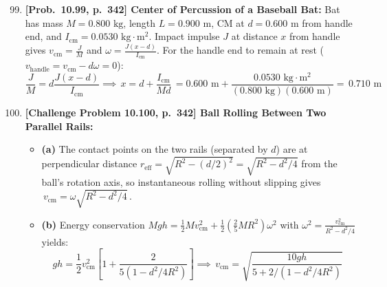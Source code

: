\documentclass[11pt,a4paper,openany,oneside]{book}
\newcommand{\eqbox}[1]{\boxed{\,#1\,}}
\numberwithin{equation}{chapter}
\begin{document}
\begin{enumerate}[label=\textbf{Prob.\ 10.\arabic*},leftmargin=4.5em]
  \setcounter{enumi}{98}
  \item \textbf{[Prob.\ 10.99, p.\ 342] Center of Percussion of a Baseball Bat:}
  Bat has mass $M = 0.800\text{ kg}$, length $L = 0.900\text{ m}$, CM at $d = 0.600\text{ m}$ from handle end, and $I_{\text{cm}} = 0.0530\text{ kg}\cdot\text{m}^2$. Impact impulse $J$ at distance $x$ from handle gives $v_{\text{cm}} = \frac{J}{M}$ and $\omega = \frac{J(x - d)}{I_{\text{cm}}}$. For the handle end to remain at rest ($v_{\text{handle}} = v_{\text{cm}} - d\omega = 0$):
  \begin{equation*}
    \frac{J}{M} = d\frac{J(x - d)}{I_{\text{cm}}} \implies \eqbox{x = d + \frac{I_{\text{cm}}}{Md}} = 0.600\text{ m} + \frac{0.0530\text{ kg}\cdot\text{m}^2}{(0.800\text{ kg})(0.600\text{ m})} = \eqbox{0.710\text{ m}}
  \end{equation*}

  \item \textbf{[Challenge Problem 10.100, p.\ 342] Ball Rolling Between Two Parallel Rails:}
  \begin{itemize}
    \item \textbf{(a)} The contact points on the two rails (separated by $d$) are at perpendicular distance $r_{\text{eff}} = \sqrt{R^2 - (d/2)^2} = \sqrt{R^2 - d^2/4}$ from the ball's rotation axis, so instantaneous rolling without slipping gives $\eqbox{v_{\text{cm}} = \omega\sqrt{R^2 - d^2/4}}$.
    \item \textbf{(b)} Energy conservation $Mgh = \frac{1}{2}Mv_{\text{cm}}^2 + \frac{1}{2}\!\left(\frac{2}{5}MR^2\right)\omega^2$ with $\omega^2 = \frac{v_{\text{cm}}^2}{R^2 - d^2/4}$ yields:
    \begin{equation*}
      gh = \frac{1}{2}v_{\text{cm}}^2\!\left[1 + \frac{2}{5(1 - d^2/4R^2)}\right] \implies \eqbox{v_{\text{cm}} = \sqrt{\frac{10gh}{5 + 2/(1 - d^2/4R^2)}}}
    \end{equation*}
  \end{itemize}


\end{enumerate}
\end{document}
